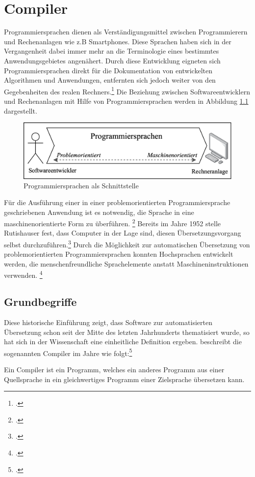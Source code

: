 \chapter{Compiler}
\label{chap:Compiler}

Programmiersprachen dienen als Verständigungsmittel zwischen Programmierern und Rechenanlagen wie z.B Smartphones.  Diese Sprachen haben sich in der Vergangenheit dabei immer mehr an die  Terminologie eines bestimmtes Anwendungsgebietes angenähert. Durch diese Entwicklung eigneten sich Programmiersprachen direkt für die Dokumentation von entwickelten Algorithmen und Anwendungen, entfernten sich jedoch weiter von den Gegebenheiten des realen Rechners.\footcite[Vgl.][S. 15]{Schneider1975} Die Beziehung zwischen Softwareentwicklern und Rechenanlagen mit Hilfe von Programmiersprachen werden in Abbildung \ref{fig:Programmiersprachen als Schnittstelle} dargestellt. 

\begin{figure}[!ht]
 \includegraphics[width=\textwidth,height=\textheight,keepaspectratio]{Images/LanguageIntermediary.png}
 \caption{Programmiersprachen als Schnittstelle}
 \label{fig:Programmiersprachen als Schnittstelle}
\end{figure}

Für die Ausführung einer in einer problemorientierten Programmiersprache geschriebenen Anwendung ist es notwendig, die Sprache in eine maschinenorientierte Form zu überführen. \footcite[Vgl.][S. 15]{Schneider1975} Bereits im Jahre 1952 stelle Rutishauser fest,  dass Computer in der Lage sind,  diesen Übersetzungsvorgang selbst durchzuführen.\footcite[Vgl.][S. 312]{Rutishauser1952} 
Durch die Möglichkeit zur automatischen Übersetzung von problemorientierten Programmiersprachen konnten Hochsprachen entwickelt werden, die menschenfreundliche Sprachelemente anstatt Maschineninstruktionen verwenden. \footcite[Vgl.][S. 47]{Wagenknecht2014}
\section{ Grundbegriffe}
Diese historische Einführung zeigt,  dass Software zur automatisierten Übersetzung schon seit der Mitte des letzten Jahrhunderts thematisiert wurde, so hat sich in der Wissenschaft eine einheitliche Definition ergeben.  \citeauthor{Ullmann2008} beschreibt die sogenannten Compiler im Jahre \citeyear{Ullmann2008} wie folgt:\footcite[Vgl.][S. 1]{Ullmann2008} 
\begin{Def}[Compiler]
Ein Compiler ist ein Programm, welches ein anderes Programm aus einer Quellsprache in ein gleichwertiges Programm einer Zielsprache übersetzen kann.
\end{Def} 
\vspace{-1em}

